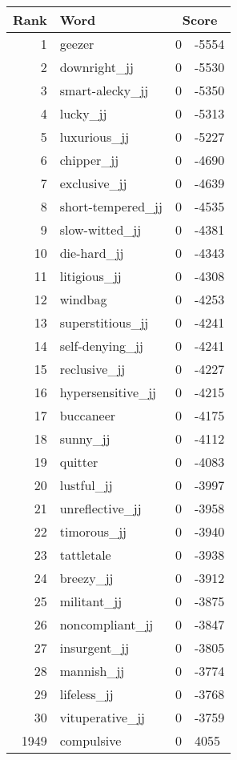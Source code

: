 \begin{longtable}[!htbp]{| rlr@{.}l |}
    \hline
    \textbf{Rank} & \textbf{Word} & \multicolumn{2}{c|}{\textbf{Score}} \\
    \hline
    \endhead
    1 & geezer & 0 & -5554 \\
    2 & downright\_jj & 0 & -5530 \\
    3 & smart-alecky\_jj & 0 & -5350 \\
    4 & lucky\_jj & 0 & -5313 \\
    5 & luxurious\_jj & 0 & -5227 \\
    6 & chipper\_jj & 0 & -4690 \\
    7 & exclusive\_jj & 0 & -4639 \\
    8 & short-tempered\_jj & 0 & -4535 \\
    9 & slow-witted\_jj & 0 & -4381 \\
    10 & die-hard\_jj & 0 & -4343 \\
    11 & litigious\_jj & 0 & -4308 \\
    12 & windbag & 0 & -4253 \\
    13 & superstitious\_jj & 0 & -4241 \\
    14 & self-denying\_jj & 0 & -4241 \\
    15 & reclusive\_jj & 0 & -4227 \\
    16 & hypersensitive\_jj & 0 & -4215 \\
    17 & buccaneer & 0 & -4175 \\
    18 & sunny\_jj & 0 & -4112 \\
    19 & quitter & 0 & -4083 \\
    20 & lustful\_jj & 0 & -3997 \\
    21 & unreflective\_jj & 0 & -3958 \\
    22 & timorous\_jj & 0 & -3940 \\
    23 & tattletale & 0 & -3938 \\
    24 & breezy\_jj & 0 & -3912 \\
    25 & militant\_jj & 0 & -3875 \\
    26 & noncompliant\_jj & 0 & -3847 \\
    27 & insurgent\_jj & 0 & -3805 \\
    28 & mannish\_jj & 0 & -3774 \\
    29 & lifeless\_jj & 0 & -3768 \\
    30 & vituperative\_jj & 0 & -3759 \\
    1949 & compulsive & 0 & 4055 \\

\end{longtable}
